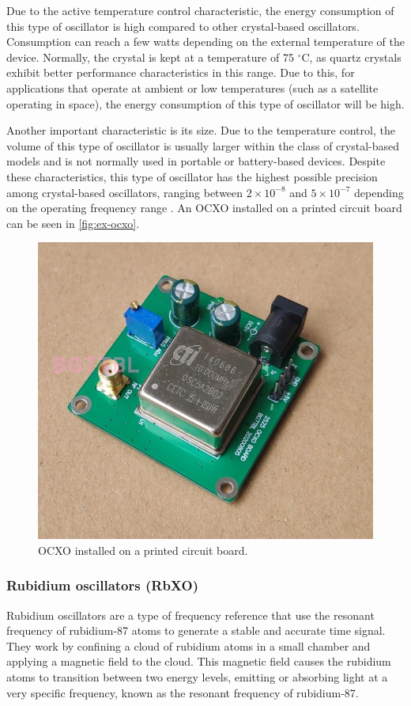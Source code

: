 Due to the active temperature control characteristic, the energy consumption of this type of oscillator is high compared to other crystal-based oscillators. Consumption can reach a few watts depending on the external temperature of the device. Normally, the crystal is kept at a temperature of 75 $^{\circ}$C, as quartz crystals exhibit better performance characteristics in this range. Due to this, for applications that operate at ambient or low temperatures (such as a satellite operating in space), the energy consumption of this type of oscillator will be high.

Another important characteristic is its size. Due to the temperature control, the volume of this type of oscillator is usually larger within the class of crystal-based models and is not normally used in portable or battery-based devices. Despite these characteristics, this type of oscillator has the highest possible precision among crystal-based oscillators, ranging between $2 \times 10^{-8}$ and $5 \times 10^{-7}$ depending on the operating frequency range \cite{mancini2004}. An OCXO installed on a printed circuit board can be seen in \autoref{fig:ex-ocxo}.

\begin{figure}[!ht]
    \begin{center}
        \includegraphics[width=0.5\columnwidth]{figures/ex-ocxo.jpg}
        \caption{OCXO installed on a printed circuit board.}
        \label{fig:ex-ocxo}
    \end{center}
\end{figure}

\subsubsection{Rubidium oscillators (RbXO)}


Rubidium oscillators are a type of frequency reference that use the resonant frequency of rubidium-87 atoms to generate a stable and accurate time signal. They work by confining a cloud of rubidium atoms in a small chamber and applying a magnetic field to the cloud. This magnetic field causes the rubidium atoms to transition between two energy levels, emitting or absorbing light at a very specific frequency, known as the resonant frequency of rubidium-87.

